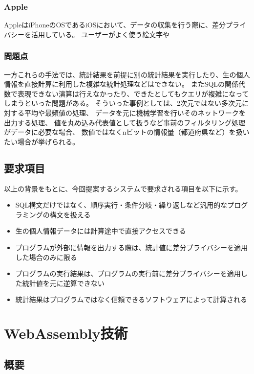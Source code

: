 \documentclass[a4paper,11pt]{jreport}
\begin{document}
\subsection{Apple}

AppleはiPhoneのOSであるiOSにおいて、データの収集を行う際に、差分プライバシーを活用している。
ユーザーがよく使う絵文字や

\subsection{問題点}

一方これらの手法では、統計結果を前提に別の統計結果を実行したり、生の個人情報を直接計算に利用した複雑な統計処理などはできない。
またSQLの関係代数で表現できない演算は行えなかったり、できたとしてもクエリが複雑になってしまうといった問題がある。
そういった事例としては、2次元ではない多次元に対する平均や最頻値の処理、
データを元に機械学習を行いそのネットワークを出力する処理、
値を丸め込み代表値として扱うなど事前のフィルタリング処理がデータに必要な場合、
数値ではなくnビットの情報量（都道府県など）を扱いたい場合が挙げられる。

\section{要求項目}

以上の背景をもとに、今回提案するシステムで要求される項目を以下に示す。
\begin{itemize}
    \item SQL構文だけではなく、順序実行・条件分岐・繰り返しなど汎用的なプログラミングの構文を扱える
    \item 生の個人情報データには計算途中で直接アクセスできる
    \item プログラムが外部に情報を出力する際は、統計値に差分プライバシーを適用した場合のみに限る
    \item プログラムの実行結果は、プログラムの実行前に差分プライバシーを適用した統計値を元に逆算できない
    \item 統計結果はプログラムではなく信頼できるソフトウェアによって計算される
\end{itemize}

\chapter{WebAssembly技術}

\section{概要}
\end{document}
